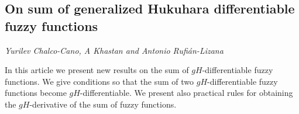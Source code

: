 \documentclass[../booklet.tex]{subfiles}
\begin{document}
\subsection[On sum of generalized Hukuhara differentiable fuzzy functions. {\it Yurilev Chalco-Cano, A Khastan and Antonio Rufián-Lizana}]{On sum of generalized Hukuhara differentiable fuzzy functions}
  

\begin{center}
  {\it Yurilev Chalco-Cano, A Khastan and Antonio Rufián-Lizana}
\end{center}



In this article we present new results on the sum of $gH$-differentiable fuzzy functions. We give conditions so that the sum of two $gH$-differentiable fuzzy functions become $gH$-differentiable. We present also practical rules for obtaining the $gH$-derivative of the sum of fuzzy functions. 

\end{document}
